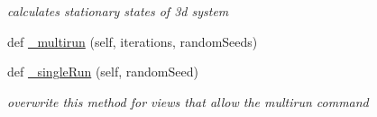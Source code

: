 \begin{DoxyCompactItemize}
\begin{DoxyCompactList}\small\item\em calculates stationary states of 3d system \end{DoxyCompactList}\item 
def \hyperlink{class_mu_mo_t_1_1_mu_mo_t_1_1_mu_mo_tview_a4d4a00545816bf68f912f5ea5a449c48}{\+\_\+multirun} (self, iterations, random\+Seeds)
\item 
def \hyperlink{class_mu_mo_t_1_1_mu_mo_t_1_1_mu_mo_tview_a51d421aacb4cd83af5f1c2e60c3dff9c}{\+\_\+single\+Run} (self, random\+Seed)
\begin{DoxyCompactList}\small\item\em overwrite this method for views that allow the \textquotesingle{}multirun\textquotesingle{} command \end{DoxyCompactList}\end{DoxyCompactItemize}
